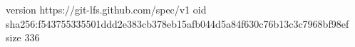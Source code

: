 version https://git-lfs.github.com/spec/v1
oid sha256:f543755335501ddd2e383cb378eb15afb044d5a84f630c76b13c3c7968bf98ef
size 336
